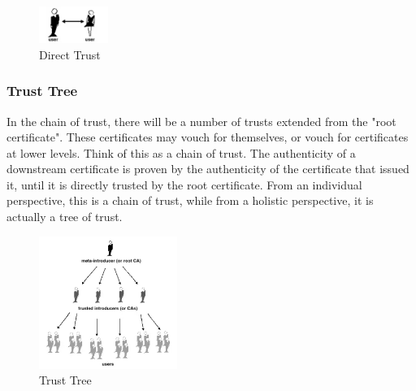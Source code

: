 \begin{figure}[H] %
    \centering %
    \includegraphics[width=0.2\textwidth]{figures/directTrust.png} %
    \caption{Direct Trust} %
    \label{Fig.3: Direct Trust} %
    \end{figure}


\subsubsection{Trust Tree}
In the chain of trust, there will be a number of trusts extended from the "root 
certificate". These certificates may vouch for themselves, or vouch for certificates 
at lower levels. Think of this as a chain of trust\cite{b31}. The authenticity of a downstream 
certificate is proven by the authenticity of the certificate that issued it, until 
it is directly trusted by the root certificate. From an individual perspective, this 
is a chain of trust, while from a holistic perspective, it is actually a tree of trust\cite{b28}.

\begin{figure}[H] %
    \centering %
    \includegraphics[width=0.4\textwidth]{figures/trustTree.png} %
    \caption{Trust Tree} %
    \label{Fig.4: Trust Tree} %
    \end{figure}



